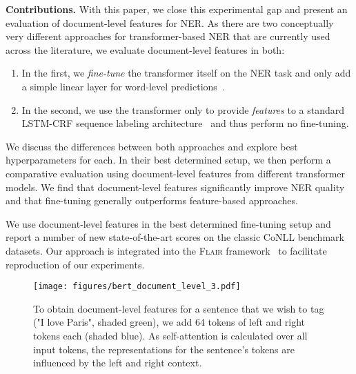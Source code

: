 \documentclass[11pt,a4paper]{article}
\begin{document}
\noindent
\textbf{Contributions.}
With this paper, we close this experimental gap and present an evaluation of document-level features for NER. As there are two conceptually very different approaches for transformer-based NER that are currently used across the literature, we evaluate document-level features in both: 

\begin{enumerate}
    \item In the first, we \textit{fine-tune} the transformer itself on the NER task and only add a simple linear layer for word-level predictions~\cite{devlin-etal-2019-bert}.
    \item In the second, we use the transformer only to provide \textit{features} to a standard LSTM-CRF sequence labeling architecture~\cite{2015arXiv150801991H} and thus perform no fine-tuning.
\end{enumerate}
We discuss the differences between both approaches and explore best hyperparameters for each. In their best determined setup, we then perform a comparative evaluation using document-level features from different transformer models.
We find that document-level features significantly improve NER quality and that fine-tuning generally outperforms feature-based approaches. 

We use document-level features in the best determined fine-tuning setup and report a number of new state-of-the-art scores on the classic CoNLL benchmark datasets.  Our approach is integrated into the \textsc{Flair} framework~\cite{akbik-etal-2019-flair} to facilitate reproduction of our experiments.


















\begin{figure*}
 \centering
 \texttt{[image: figures/bert\_document\_level\_3.pdf]}
\vspace{-6mm}
 \caption{To obtain document-level features for a sentence that we wish to tag ("I love Paris", shaded green), we add 64 tokens of left and right tokens each (shaded blue). As self-attention is calculated over all input tokens, the representations for the sentence's tokens are influenced by the left and right context.}
 \label{overview-bert-fine-tuning-document-level}
\end{figure*}
\end{document}
